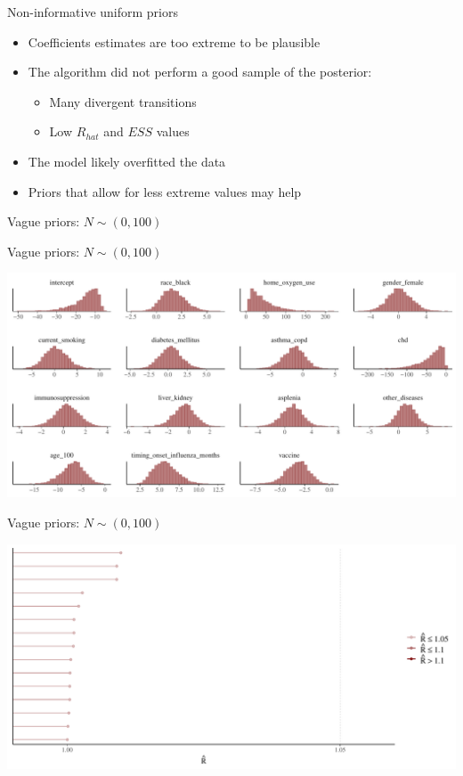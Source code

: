 \documentclass[ignorenonframetext,a4paper]{beamer}
\providecommand{\tightlist}{%
  \setlength{\itemsep}{0pt}\setlength{\parskip}{0pt}}
\begin{document}
\begin{frame}{Non-informative uniform priors}

\begin{itemize}
\item
  Coefficients estimates are too extreme to be plausible
\item
  The algorithm did not perform a good sample of the posterior:

  \begin{itemize}
  \tightlist
  \item
    Many divergent transitions
  \item
    Low \(R_{hat}\) and \(ESS\) values
  \end{itemize}
\item
  The model likely overfitted the data
\item
  Priors that allow for less extreme values may help
\end{itemize}

\end{frame}

\begin{frame}{Vague priors: \(N \sim \left( 0, 100 \right)\)}

\end{frame}

\begin{frame}{Vague priors: \(N \sim \left( 0, 100 \right)\)}

\includegraphics{DB_presentation_case_study_files/figure-beamer/unnamed-chunk-30-1.pdf}

\end{frame}

\begin{frame}{Vague priors: \(N \sim \left( 0, 100 \right)\)}

\includegraphics{DB_presentation_case_study_files/figure-beamer/unnamed-chunk-31-1.pdf}

\end{frame}
\end{document}
